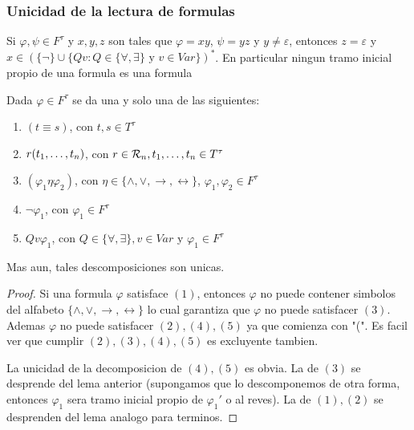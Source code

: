 \subsubsection{Unicidad de la lectura de formulas}
\begin{proposition}
  Si $\varphi, \psi \in F^\tau$ y $x, y, z$ son tales que $\varphi = xy$, $\psi = yz$ y $y \neq \varepsilon$, entonces
  $z = \varepsilon$ y $x \in (\{\neg\} \cup \{Qv : Q \in \{\forall, \exists\} \text{ y } v \in Var\})^*$. En particular ningun tramo inicial
  propio de una formula es una formula
\end{proposition}
\noproof
\begin{theorem}
  Dada $\varphi \in F^\tau$ se da una y solo una de las siguientes:
  \begin{enumerate}
    \item $(t\equiv s)$, con $t, s \in T^\tau$
    \item $r(t_{1}, \dots, t_{n})$, con $r \in \mathcal{R}_n, t_{1}, \dots, t_{n} \in T^\tau$
    \item $(\varphi_1 \eta \varphi_2)$, con $\eta \in \{\land, \lor, \rightarrow, \leftrightarrow\}$, $\varphi_1, \varphi_2 \in F^\tau$
    \item $\neg\varphi_1$, con $\varphi_1 \in F^\tau$
    \item $Qv\varphi_1$, con $Q \in \{\forall, \exists\}, v \in Var$ y $\varphi_1 \in F^\tau$
  \end{enumerate}
  Mas aun, tales descomposiciones son unicas.
\end{theorem}
\begin{proof}
  Si una formula $\varphi$ satisface $(1)$, entonces $\varphi$ no puede contener simbolos del alfabeto $\{\land,\lor,\rightarrow,\leftrightarrow\}$ lo 
  cual garantiza que $\varphi$ no puede satisfacer $(3)$. Ademas $\varphi$ no puede satisfacer $(2), (4), (5)$ ya que comienza con "(".
  Es facil ver que cumplir $(2), (3), (4), (5)$ es excluyente tambien.

  La unicidad de la decomposicion de $(4), (5)$ es obvia. La de $(3)$ se desprende del lema anterior (supongamos que 
  lo descomponemos de otra forma, entonces $\varphi_1$ sera tramo inicial propio de $\varphi_1'$ o al reves). 
  La de $(1), (2)$ se desprenden del lema analogo para terminos.
\end{proof}
